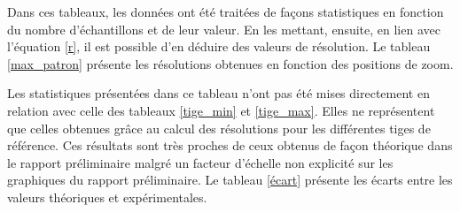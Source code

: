 \documentclass[11pt,letterpaper]{article}
\begin{document}
Dans ces tableaux, les données ont été traitées de façons statistiques en fonction du nombre d'échantillons et de leur valeur. En les mettant, ensuite, en lien avec l'équation \ref{r}, il est possible d'en déduire des valeurs de résolution. Le tableau \ref{max_patron} présente les résolutions obtenues en fonction des positions de zoom. 

\begin{table}[H]
\centering
{}
\caption{Tableau de la résolution en fonction de la position du zoom.}
\label{max_patron}
\end{table}

Les statistiques présentées dans ce tableau n'ont pas été mises directement en relation avec celle des tableaux \ref{tige_min} et \ref{tige_max}. Elles ne représentent que celles obtenues grâce au calcul des résolutions pour les différentes tiges de référence. Ces résultats sont très proches de ceux obtenus de façon théorique dans le rapport préliminaire malgré un facteur d'échelle non explicité sur les graphiques du rapport préliminaire. Le tableau \ref{écart} présente les écarts entre les valeurs théoriques et expérimentales. 

\begin{table}[H]
\centering
{}
\caption{Tableau des écarts entre les valeurs théoriques et expérimentales.}
\label{écart}
\end{table}
\end{document}
